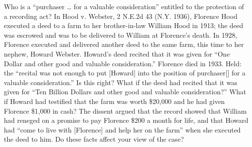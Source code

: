 \item Who is a ``purchaser \dots{} for a valuable consideration'' entitled to
the protection of a recording act? In Hood v. Webster, 2 N.E.2d 43 (N.Y. 1936),
Florence Hood executed a deed to a farm to her brother-in-law William Hood in
1913; the deed was escrowed and was to be delivered to William at Florence's
death. In 1928, Florence executed and delivered another deed to the same farm,
this time to her nephew, Howard Webster. Howard's deed recited that it was
given for ``One Dollar and other good and valuable consideration.'' Florence
died in 1933. Held: the ``recital was not enough to put [Howard] into the
position of purchaser[] for a valuable consideration.'' Is this right? What if
the deed had recited that it was given for ``Ten Billion Dollars and other good
and valuable consideration?'' What if Howard had testified that the farm was
worth \$20,000 and he had given Florence \$1,000 in cash? The dissent argued
that the record showed that William had reneged on a promise to pay Florence
\$200 a month for life, and that Howard had ``come to live with [Florence] and
help her on the farm'' when she executed the deed to him. Do these facts affect
your view of the case?

